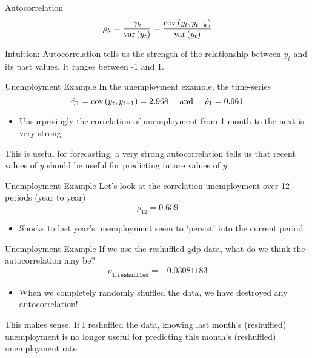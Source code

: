 \documentclass[aspectratio=169,t,11pt,table]{beamer}
\begin{document}
\begin{frame}{Autocorrelation}
  \vspace*{-\bigskipamount}
  $$
    \rho_k = \frac{\gamma_k}{\var{y_t}} = \frac{\cov{y_t, y_{t-k}}}{\var{y_t}}
  $$
  
  \bigskip
  \alert{Intuition}: Autocorrelation tells us the strength of the relationship between $y_t$ and its past values. It ranges between -1 and 1.
\end{frame}


\begin{frame}{Unemployment Example}
  In the unemployment example, the time-series 
  $$
    \hat{\gamma}_1 = \cov{y_t, y_{t-1}} = 2.968 \quad \text{ and } \quad \hat{\rho}_1 = 0.961
  $$
  \begin{itemize}
    \item Unsurprisingly the correlation of unemployment from 1-month to the next is very strong
  \end{itemize}

  \pause
  \bigskip
  This is useful for forecasting; a very strong autocorrelation tells us that recent values of $y$ should be useful for predicting future values of $y$
\end{frame}

\begin{frame}{Unemployment Example}
  Let's look at the correlation unemployment over 12 periods (year to year)
  $$
    \hat{\rho}_{12} = 0.659
  $$
  \begin{itemize}
    \item Shocks to last year's unemployment seem to `persist' into the current period
  \end{itemize}
\end{frame}

\begin{frame}{Unemployment Example}
  If we use the reshuffled gdp data, what do we think the autocorrelation may be?
  \pause
  $$
    \hat{\rho}_{1, \texttt{reshuffled}} =  -0.03081183
  $$  
  \begin{itemize}
    \item When we completely randomly shuffled the data, we have destroyed any autocorrelation! 
  \end{itemize}

  \pause  
  \bigskip
  This makes sense. If I reshuffled the data, knowing last month's (reshuffled) unemployment is no longer useful for predicting this month's (reshuffled) unemployment rate
\end{frame}
\end{document}
